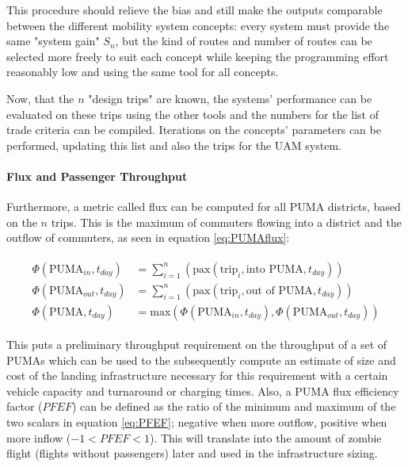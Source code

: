 This procedure should relieve the bias and still make the outputs comparable between the different mobility system concepts: every system must provide the same "system gain" $S_n$, but the kind of routes and number of routes can be selected more freely to suit each concept while keeping the programming effort reasonably low and using the same tool for all concepts.

Now, that the $n$ "design trips" are known, the systems' performance can be evaluated on these trips using the other tools and the numbers for the list of trade criteria can be compiled. Iterations on the concepts' parameters can be performed, updating this list and also the trips for the UAM system.


\paragraph{Flux and Passenger Throughput}

 Furthermore, a metric called flux can be computed for all PUMA districts, based on the $n$ trips. This is the maximum of commuters flowing into a district and the outflow of commuters, as seen in equation \ref{eq:PUMAflux}:

\begin{align} \label{eq:PUMAflux}
    \begin{split}
    \Phi(\text{PUMA}_{in}, t_{day}) &= \sum_{i=1}^n{ \left( \text{pax}(\text{trip}_i, \text{into   PUMA}, t_{day})\right)}\\
    \Phi(\text{PUMA}_{out}, t_{day}) &= \sum_{i=1}^n{ \left( \text{pax}(\text{trip}_i, \text{out of PUMA}, t_{day})\right)}\\
    \Phi(\text{PUMA}, t_{day}) &= \text{max} 
    \left(
        \Phi(\text{PUMA}_{in}, t_{day}),
        \Phi(\text{PUMA}_{out}, t_{day})
    \right)
    \end{split}
\end{align}

This puts a preliminary throughput requirement on the throughput of a set of PUMAs which can be used to the subsequently compute an estimate of size and cost of the landing infrastructure necessary for this requirement with a certain vehicle capacity and turnaround or charging times. Also, a PUMA flux efficiency factor ($PFEF$) can be defined as the ratio of the minimum and maximum of the two scalars in equation \ref{eq:PFEF}; negative when more outflow, positive when more inflow ($-1 < PFEF < 1$). This will translate into the amount of zombie flight (flights without passengers) later and used in the infrastructure sizing.

